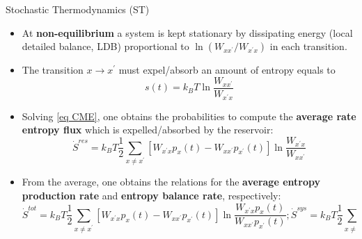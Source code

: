 \documentclass[final]{beamer}
\newlength{\colwidth}
\begin{document}
\begin{frame}[t]
\begin{columns}[t]
\begin{column}{\colwidth}
\begin{block}{Stochastic Thermodynamics (ST)}
\begin{itemize}
\item At {\bf non-equilibrium} a system is kept stationary by dissipating energy (local detailed balance, LDB) proportional to $\ln (W_{xx^\prime} / W_{x^\prime x})$ in each transition\cite{10.21468/SciPostPhysLectNotes.32}.
\end{itemize}
\begin{itemize}
\item The transition $x \rightarrow x^\prime$ must expel/absorb an amount of entropy equals to
%
\begin{equation}
s(t) = k_B T \ln \frac{W_{xx^\prime}}{W_{x^\prime x}}
\end{equation}
%
\item Solving \eqref{eq CME}, one obtains the probabilities to compute the {\bf average rate entropy flux} which is expelled/absorbed by the reservoir\cite{peliti2021stochastic}:
%
\begin{equation}
\dot{S}^{res} = k_B T \frac{1}{2} \sum_{x \neq x^\prime} \left[ W_{x^\prime x} p_x(t) -  W_{x x^\prime}p_{x^\prime}(t) \right] \ln \frac{W_{x^\prime x}}{W_{xx^\prime}}
\end{equation}
%
\item From the average, one obtains the relations for the {\bf average entropy production rate} and {\bf entropy balance rate}\cite{Schnakenberg:1976aa}, respectively:
%
\begin{subequations}
\begin{equation}
\dot{S}^{tot}  = k_B T\frac{1}{2} \sum_{x \neq x^\prime} \left[ W_{x^\prime x} p_x(t) -  W_{x x^\prime}p_{x^\prime}(t) \right] \ln \frac{W_{x^\prime x} p_x(t)}{W_{xx^\prime}p_{x^\prime}(t)};
\end{equation}
\begin{equation}
 \dot{S}^{sys} = k_B T \frac{1}{2} \sum_{x \neq x^\prime} \left[ W_{x^\prime x} p_x(t) -  W_{x x^\prime}p_{x^\prime}(t) \right] \ln \frac{p_x(t)}{p_{x^\prime}(t)}.
\end{equation}
\end{subequations}

\end{itemize}





\end{block}
\end{column}
\end{columns}
\end{frame}
\end{document}
